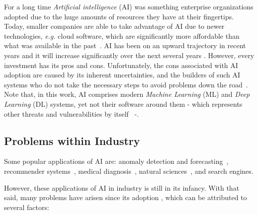 \documentclass{article}
\begin{document}
For a long time \emph{Artificial intelligence} (AI) was something enterprise organizations adopted due to the huge amounts of resources they have at their fingertips. Today, smaller companies are able to take advantage of AI due to newer technologies, \emph{e.g.} cloud software, which are significantly more affordable than what was available in the past~\cite{alsheibani2018artificial, cubric2020drivers, duan2019artificial, floridi2018ai4people}. AI has been on an upward trajectory in recent years and it will increase significantly over the next several years 
\cite{hbr} \cite{IBM} \cite{PwC}. 
However, every investment has its pros and cons. Unfortunately, the cons associated with AI adoption are caused by its inherent uncertainties, and the builders of such AI systems who do not take the necessary steps to avoid problems down the road~\cite{marr2018artificial, floridi2018ai4people}. Note that, in this work, AI comprises modern \emph{Machine Learning} (ML) and \emph{Deep Learning} (DL) systems, yet not their software around them - which represents other threats and vulnerabilities by itself~\cite{mcgraw2004software, alhazmi2007measuring, dowd2006art} -.


\subsection{Problems within Industry}

Some popular applications of AI are: anomaly detection and forecasting~\cite{makridakis2018statistical, sultani2018real,gordeev2020backtesting}, recommender systems~\cite{portugal2018use}, medical diagnosis~\cite{suzuki2017overview,esteva2021deep}, natural sciences~\cite{conde2021weakly, conde2022few, henkel2021recognizing}, and search engines\cite{conde2022general, conde2021clip}.

However, these applications of AI in industry is still in its infancy. With that said, many problems have arisen since its adoption \cite{ai_incidents, floridi2018ai4people, marr2018artificial}, which can be attributed to several factors:
\end{document}
